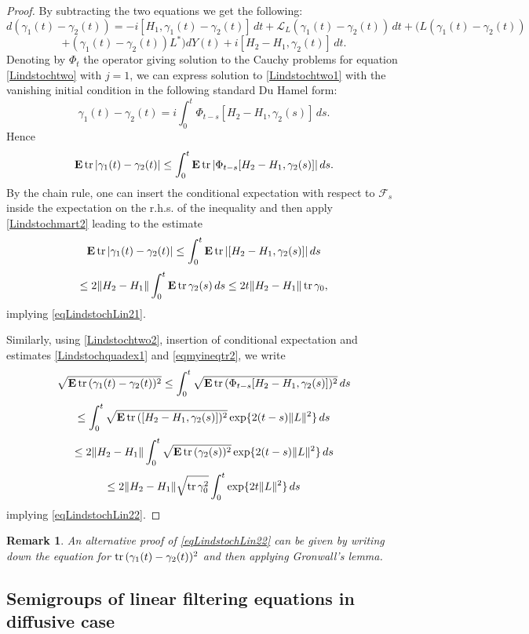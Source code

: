 \documentclass[12pt]{article}
\def\LC{\mathcal{L}}
\def\FC{\mathcal{F}}
\def\E{\mathbf{E}}
\def\tr{\rm{tr}}
\def\ga{\gamma}
\newtheorem{remark}{Remark}
\begin{document}
\begin{proof}
By subtracting the two equations we get the following:
\[
d(\ga_1(t)-\ga_2(t))=-i[H_1,\ga_1(t)-\ga_2(t)] \, dt
+\LC_L (\ga_1(t)-\ga_2(t)) \, dt +(L(\ga_1(t)-\ga_2(t))
\]
\begin{equation}
\label{Lindstochtwo1}
+(\ga_1(t)-\ga_2(t)) L^*) dY(t)
+i[H_2-H_1, \ga_2(t)] \, dt.
\end{equation}
Denoting by $\Phi_t$ the operator giving solution to the Cauchy problems for equation \eqref{Lindstochtwo}
with $j=1$, we can express solution to \eqref{Lindstochtwo1} with the vanishing
initial condition in the following standard Du Hamel form:
\begin{equation}
\label{Lindstochtwo2}
\ga_1(t)-\ga_2(t)=i\int_0^t \Phi_{t-s} [H_2-H_1, \ga_2(s)] \, ds.
\end{equation}
Hence
\[
\E \, {\tr}\, |\ga_1(t)-\ga_2(t)|\le \int_0^t \E \, {\tr} \, |\Phi_{t-s} [H_2-H_1, \ga_2(s)]| \, ds.
\]
By the chain rule,  one can insert the conditional expectation with
respect to $\FC_s$ inside the expectation on the r.h.s. of the inequality
and then apply \eqref{Lindstochmart2} leading to the estimate
\[
\E \, {\tr}\, |\ga_1(t)-\ga_2(t)|\le \int_0^t \E \, {\tr} \, | [H_2-H_1, \ga_2(s)]| \, ds
\]
\[
\le 2\|H_2-H_1\| \int_0^t \E \, {\tr} \, \ga_2(s) \, ds
\le 2 t \|H_2-H_1\|  \, {\tr} \, \ga_0,
\]
implying \eqref{eqLindstochLin21}.

Similarly, using \eqref{Lindstochtwo2}, insertion of conditional expectation
and estimates  \eqref{Lindstochquadex1} and \eqref{eqmyineqtr2}, we write
\[
\sqrt{\E \, {\tr}\, (\ga_1(t)-\ga_2(t))^2}
\le \int_0^t \sqrt{ \E \, {\tr} \, (\Phi_{t-s} [H_2-H_1, \ga_2(s)])^2} \, ds
\]
\[
\le \int_0^t \sqrt{\E \, {\tr} \, ([H_2-H_1, \ga_2(s)])^2} \exp\{2(t-s)\|L\|^2\} \, ds
\]
\[
\le 2\|H_2-H_1\| \int_0^t \sqrt{\E \, {\tr} \, (\ga_2(s))^2} \exp\{2(t-s)\|L\|^2\} \, ds
\]
\[
\le 2 \|H_2-H_1\| \sqrt{{\tr} \, \ga_0^2} \int_0^t \exp\{2t\|L\|^2\} \, ds
\]
implying \eqref{eqLindstochLin22}.
\end{proof}

\begin{remark} An alternative proof of \eqref{eqLindstochLin22} can be given by writing
down the equation for ${\tr} \, (\ga_1(t)-\ga_2(t))^2$ and then applying Gronwall's lemma.
\end{remark}

\subsection{Semigroups of linear filtering equations in diffusive case}
\end{document}
